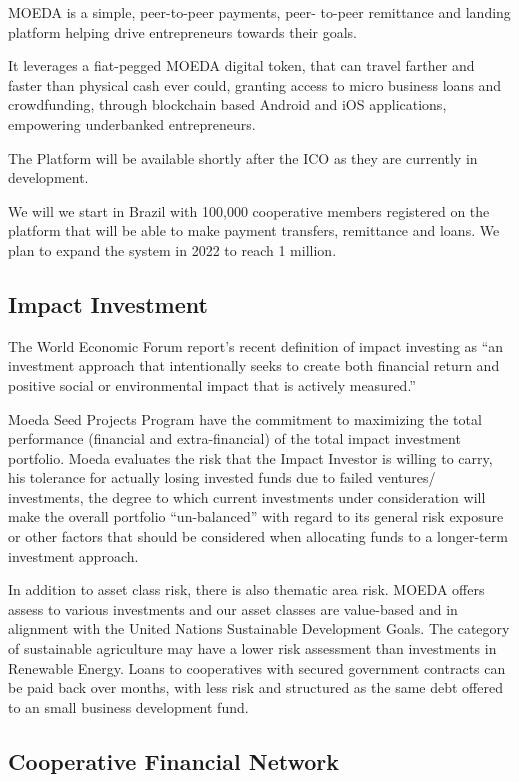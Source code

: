 \documentclass{article}
\begin{document}
MOEDA is a simple, peer-to-peer payments, peer- to-peer remittance and landing platform helping drive entrepreneurs towards their goals.

It leverages a fiat-pegged MOEDA digital token, that can travel farther and faster than physical cash ever could, granting access to micro business loans and crowdfunding, through blockchain based Android and iOS applications, empowering underbanked entrepreneurs.

The Platform will be available shortly after the ICO as they are currently in development.  

We will we start in Brazil with 100,000 cooperative members registered on the platform that will be able to make payment transfers, remittance and loans. We plan to expand the system in 2022 to reach 1 million.  


\subsection {Impact Investment}

The World Economic Forum report’s recent definition of impact investing as “an investment approach that intentionally seeks to create both financial return and positive social or environmental impact that is actively measured.” 

Moeda Seed Projects Program have the commitment to maximizing the total performance (financial and extra-financial) of the total impact investment portfolio. 
Moeda evaluates the risk that the Impact Investor is willing to carry, his tolerance for actually losing invested funds due to failed ventures/ investments, the degree to which current investments under consideration will make the overall portfolio “un-balanced” with regard to its general risk exposure or other factors that should be considered when allocating funds to a longer-term investment approach.

In addition to asset class risk, there is also thematic area risk. MOEDA offers assess to various investments and our asset classes are value-based and in alignment with the United Nations Sustainable Development Goals. The category of sustainable agriculture may have a lower risk assessment than investments in Renewable Energy. Loans to cooperatives with secured government contracts can be paid back over months, with less risk and structured as the same debt offered to an small business development fund.

\subsection {Cooperative Financial Network}
\end{document}
